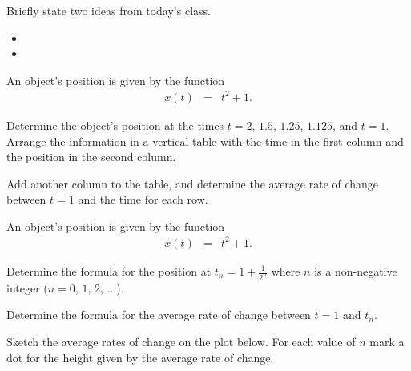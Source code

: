 \begin{problem}
\item Briefly state two ideas from today's class.
  \begin{itemize}
  \item
  \item
  \end{itemize}

  \item An object's position is given by the function
    \begin{eqnarray*}
      x(t) & = & t^2 + 1.
    \end{eqnarray*}

    \begin{subproblem}
    \item Determine the object's position at the times $t=2$, $1.5$,
      $1.25$, $1.125$, and $t=1$. Arrange the information in a
      vertical table with the time in the first column and the
      position in the second column.

      \vfill

    \item Add another column to the table, and determine the average
      rate of change between $t=1$ and the time for each row.

    \end{subproblem}

    \clearpage

  \item An object's position is given by the function
    \begin{eqnarray*}
      x(t) & = & t^2 + 1.
    \end{eqnarray*}

    \begin{subproblem}
    \item Determine the formula for the position at
      $t_n=1+\frac{1}{2^n}$ where $n$ is a non-negative integer
      ($n=0$, $1$, $2$, $\ldots$).

      \vfill

    \item Determine the formula for the average rate of change between
      $t=1$ and $t_n$.

      \vfill

    \item Sketch the average rates of change on the plot below. For
      each value of $n$ mark a dot for the height given by the average
      rate of change.



\end{subproblem}
\end{problem}
